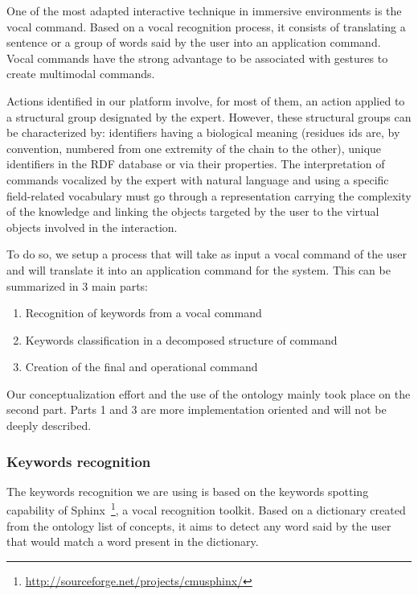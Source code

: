 \documentclass{vgtc}                          %
\begin{document}
One of the most adapted interactive technique in immersive environments is the vocal command. Based on a vocal recognition process, it consists of translating a sentence or a group of words said by the user into an application command. Vocal commands have the strong advantage to be associated with gestures to create multimodal commands.

Actions identified in our platform involve, for most of them, an action applied to a structural group designated by the expert. However, these structural groups can be characterized by: identifiers having a biological meaning (residues ids are, by convention, numbered from one extremity of the chain to the other), unique identifiers in the RDF database or via their properties.
The interpretation of commands vocalized by the expert with natural language and using a specific field-related vocabulary must go through a representation carrying the complexity of the knowledge and linking the objects targeted by the user to the virtual objects involved in the interaction.

To do so, we setup a process that will take as input a vocal command of the user and will translate it into an application command for the system. This can be summarized in 3 main parts:

\begin{enumerate}
  \item Recognition of keywords from a vocal command
  \item Keywords classification in a decomposed structure of command
  \item Creation of the final and operational command
\end{enumerate}

Our conceptualization effort and the use of the ontology mainly took place on the second part. Parts 1 and 3 are more implementation oriented and will not be deeply described.

\subsubsection{Keywords recognition}

The keywords recognition we are using is based on the keywords spotting capability of Sphinx~\footnote{\url{http://sourceforge.net/projects/cmusphinx/}}, a vocal recognition toolkit. Based on a dictionary created from the ontology list of concepts, it aims to detect any word said by the user that would match a word present in the dictionary.
\end{document}
